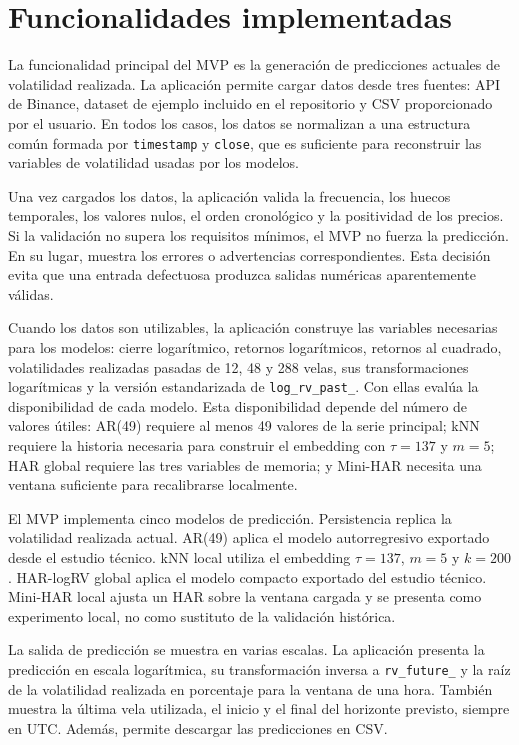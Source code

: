 \section{Funcionalidades implementadas}\label{sec:funcionalidades-mvp}

La funcionalidad principal del MVP es la generación de predicciones actuales de volatilidad realizada. La aplicación permite cargar datos desde tres fuentes: API de Binance, dataset de ejemplo incluido en el repositorio y CSV proporcionado por el usuario. En todos los casos, los datos se normalizan a una estructura común formada por \texttt{timestamp} y \texttt{close}, que es suficiente para reconstruir las variables de volatilidad usadas por los modelos.

Una vez cargados los datos, la aplicación valida la frecuencia, los huecos temporales, los valores nulos, el orden cronológico y la positividad de los precios. Si la validación no supera los requisitos mínimos, el MVP no fuerza la predicción. En su lugar, muestra los errores o advertencias correspondientes. Esta decisión evita que una entrada defectuosa produzca salidas numéricas aparentemente válidas.

Cuando los datos son utilizables, la aplicación construye las variables necesarias para los modelos: cierre logarítmico, retornos logarítmicos, retornos al cuadrado, volatilidades realizadas pasadas de 12, 48 y 288 velas, sus transformaciones logarítmicas y la versión estandarizada de \texttt{log\_\allowbreak rv\_\allowbreak past\_}. Con ellas evalúa la disponibilidad de cada modelo. Esta disponibilidad depende del número de valores útiles: AR(49) requiere al menos 49 valores de la serie principal; kNN requiere la historia necesaria para construir el embedding con \(\tau=137\) y \(m=5\); HAR global requiere las tres variables de memoria; y Mini-HAR necesita una ventana suficiente para recalibrarse localmente.

El MVP implementa cinco modelos de predicción. Persistencia replica la volatilidad realizada actual. AR(49) aplica el modelo autorregresivo exportado desde el estudio técnico. kNN local utiliza el embedding \(\tau=137\), \(m=5\) y \(k=200\). HAR-logRV global aplica el modelo compacto exportado del estudio técnico. Mini-HAR local ajusta un HAR sobre la ventana cargada y se presenta como experimento local, no como sustituto de la validación histórica.

La salida de predicción se muestra en varias escalas. La aplicación presenta la predicción en escala logarítmica, su transformación inversa a \texttt{rv\_\allowbreak future\_} y la raíz de la volatilidad realizada en porcentaje para la ventana de una hora. También muestra la última vela utilizada, el inicio y el final del horizonte previsto, siempre en UTC. Además, permite descargar las predicciones en CSV.

